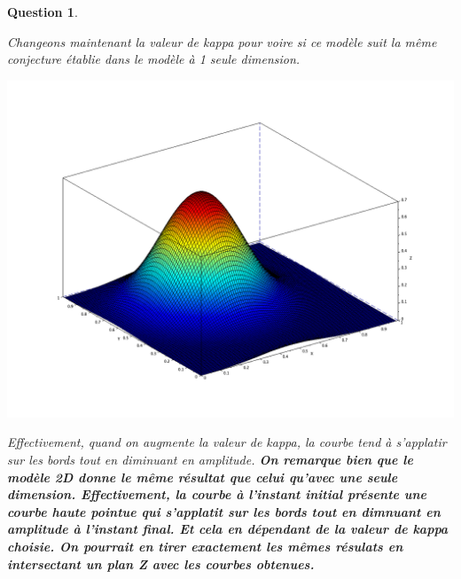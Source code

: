 \documentclass[a4paper,10pt]{article}
\newtheorem{question}{Question}
\begin{document}
\begin{question}
\begin{center}
\label{fig3}
\end{center}
\vskip 0.2cm
Changeons maintenant la valeur de kappa pour voire si ce modèle suit la même conjecture établie dans le modèle à 1 seule dimension.
\begin{center}
\includegraphics[scale=0.2]{qst5finale001.png}
\label{fig3}
\end{center}
\vskip 0.2cm
Effectivement, quand on augmente la valeur de kappa, la courbe tend à s'applatir sur les bords tout en diminuant en amplitude.
\vskip 0.2cm
\textbf{On remarque bien que le modèle 2D donne le même résultat que celui qu'avec une seule dimension.
Effectivement, la courbe à l'instant initial présente une courbe haute pointue qui s'applatit sur les bords tout en dimnuant en amplitude à l'instant final. Et cela en dépendant de la valeur de kappa choisie.
On pourrait en tirer exactement les mêmes résulats en intersectant un plan Z avec les courbes obtenues.}

\end{question}
\vskip 6cm
\end{document}
